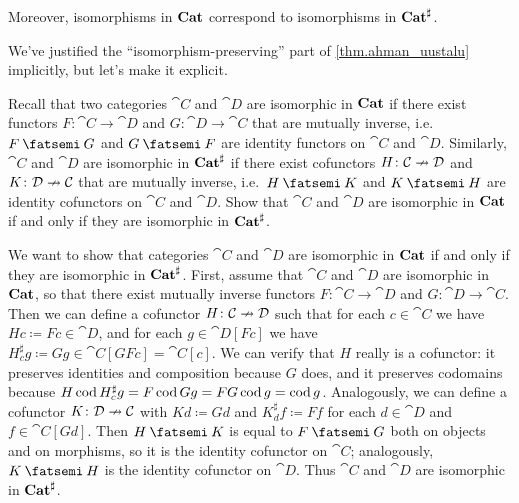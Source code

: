 \documentclass[Book-Poly]{subfiles}
\begin{document}

Moreover, isomorphisms in $\mathbf{Cat}$ correspond to isomorphisms in $\mathbf{Cat}^\sharp$.

\begin{exercise}
We've justified the ``isomorphism-preserving'' part of \cref{thm.ahman_uustalu} implicitly, but let's make it explicit.

Recall that two categories $\cat{C}$ and $\cat{D}$ are isomorphic in $\mathbf{Cat}$ if there exist functors $F\colon\cat{C}\to\cat{D}$ and $G\colon\cat{D}\to\cat{C}$ that are mutually inverse, i.e.\ $F\then G$ and $G\then F$ are identity functors on $\cat{C}$ and $\cat{D}$.
Similarly, $\cat{C}$ and $\cat{D}$ are isomorphic in $\mathbf{Cat}^\sharp$ if there exist cofunctors $H\colon\mathcal{C}\nrightarrow\mathcal{D}$ and $K\colon\mathcal{D}\nrightarrow\mathcal{C}$ that are mutually inverse, i.e.\ $H\then K$ and $K\then H$ are identity cofunctors on $\cat{C}$ and $\cat{D}$.
Show that $\cat{C}$ and $\cat{D}$ are isomorphic in $\mathbf{Cat}$ if and only if they are isomorphic in $\mathbf{Cat}^\sharp$.
\begin{solution}
We want to show that categories $\cat{C}$ and $\cat{D}$ are isomorphic in $\mathbf{Cat}$ if and only if they are isomorphic in $\mathbf{Cat}^\sharp$.
First, assume that $\cat{C}$ and $\cat{D}$ are isomorphic in $\mathbf{Cat}$, so that there exist mutually inverse functors $F\colon\cat{C}\to\cat{D}$ and $G\colon\cat{D}\to\cat{C}$.
Then we can define a cofunctor $H\colon\mathcal{C}\nrightarrow\mathcal{D}$ such that for each $c\in\cat{C}$ we have $Hc\coloneqq Fc\in\cat{D}$, and for each $g\in\cat{D}[Fc]$ we have $H^\sharp_c g\coloneqq Gg\in\cat{C}[GFc]=\cat{C}[c]$.
We can verify that $H$ really is a cofunctor: it preserves identities and composition because $G$ does, and it preserves codomains because $H\operatorname{cod} H^\sharp_c g=F\operatorname{cod} Gg=FG\operatorname{cod} g=\operatorname{cod} g$.
Analogously, we can define a cofunctor $K\colon\mathcal{D}\nrightarrow\mathcal{C}$ with $Kd\coloneqq Gd$ and $K^\sharp_d f\coloneqq Ff$ for each $d\in\cat{D}$ and $f\in\cat{C}[Gd]$.
Then $H\then K$ is equal to $F\then G$ both on objects and on morphisms, so it is the identity cofunctor on $\cat{C}$; analogously, $K\then H$ is the identity cofunctor on $\cat{D}$.
Thus $\cat{C}$ and $\cat{D}$ are isomorphic in $\mathbf{Cat}^\sharp$.


\end{solution}
\end{exercise}
\end{document}
